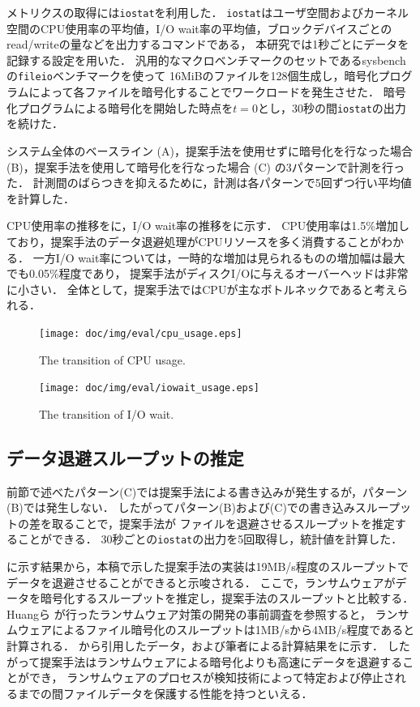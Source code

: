 メトリクスの取得には\texttt{iostat}を利用した．
\texttt{iostat}はユーザ空間およびカーネル空間のCPU使用率の平均値，I/O wait率の平均値，ブロックデバイスごとのread/writeの量などを出力するコマンドである，
本研究では1秒ごとにデータを記録する設定を用いた．
汎用的なマクロベンチマークのセットであるsysbench \cite{sysbench:online} の\texttt{fileio}ベンチマークを使って
16MiBのファイルを128個生成し，暗号化プログラムによって各ファイルを暗号化することでワークロードを発生させた．
暗号化プログラムによる暗号化を開始した時点を$t = 0$とし，30秒の間\texttt{iostat}の出力を続けた．

システム全体のベースライン (A)，提案手法を使用せずに暗号化を行なった場合 (B)，提案手法を使用して暗号化を行なった場合 (C) の3パターンで計測を行った．
計測間のばらつきを抑えるために，計測は各パターンで5回ずつ行い平均値を計算した．

CPU使用率の推移をに，I/O wait率の推移をに示す．
CPU使用率は1.5\%増加しており，提案手法のデータ退避処理がCPUリソースを多く消費することがわかる．
一方I/O wait率については，一時的な増加は見られるものの増加幅は最大でも0.05\%程度であり，
提案手法がディスクI/Oに与えるオーバーヘッドは非常に小さい．
全体として，提案手法ではCPUが主なボトルネックであると考えられる．

\begin{figure}[tb]
  \centering
  \texttt{[image: doc/img/eval/cpu\_usage.eps]}
  \caption{The transition of CPU usage.}
  \label{fig:cpu-usage}
\end{figure}

\begin{figure}[tb]
  \centering
  \texttt{[image: doc/img/eval/iowait\_usage.eps]}
  \caption{The transition of I/O wait.}
  \label{fig:iowait}
\end{figure}

\subsection{データ退避スループットの推定}
前節で述べたパターン(C)では提案手法による書き込みが発生するが，パターン(B)では発生しない．
したがってパターン(B)および(C)での書き込みスループットの差を取ることで，提案手法が
ファイルを退避させるスループットを推定することができる．
30秒ごとの\texttt{iostat}の出力を5回取得し，統計値を計算した．

に示す結果から，本稿で示した提案手法の実装は19MB/s程度のスループットで
データを退避させることができると示唆される．
ここで，ランサムウェアがデータを暗号化するスループットを推定し，提案手法のスループットと比較する．
Huangら \cite{huang2017flashguard} が行ったランサムウェア対策の開発の事前調査を参照すると，
ランサムウェアによるファイル暗号化のスループットは1MB/sから4MB/s程度であると計算される．
\cite{huang2017flashguard}から引用したデータ，および筆者による計算結果をに示す．
したがって提案手法はランサムウェアによる暗号化よりも高速にデータを退避することができ，
ランサムウェアのプロセスが検知技術によって特定および停止されるまでの間ファイルデータを保護する性能を持つといえる．

